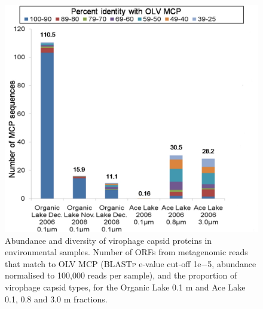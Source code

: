 \begin{figure}
\centering
\includegraphics[width=120mm]{olv_figures/OLV_time.jpg}
\caption[Abundance and diversity of virophage capsid proteins in environmental samples]{Abundance and diversity of virophage capsid proteins in environmental samples. 
Number of \acp{ORF} from metagenomic reads that match to \ac{OLV} \ac{MCP} (\textsc{BLASTp} e-value cut-off 1e$-$5, abundance normalised to 100,000 reads per sample), and the proportion of virophage capsid types, for the Organic Lake 0.1 \textmu{}m and Ace Lake 0.1, 0.8 and 3.0 \textmu{}m fractions.  
}
\label{fig:OLV_time}

\end{figure}
